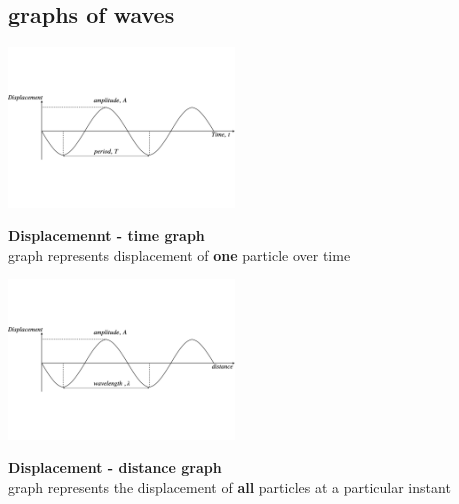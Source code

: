 \documentclass[a4paper, 10pt]{article}
\begin{document}
\subsection{graphs of waves}
\begin{minipage}{0.5\textwidth}
\includegraphics[trim = 50 50 50 50, width=6cm]{figures/1.pdf}
\end{minipage}	
\begin{minipage}{0.5\textwidth}
\textbf{Displacemennt - time graph} \\
graph represents displacement of \textbf{one} particle over time 
\end{minipage}	
\begin{minipage}{0.5\textwidth}
\includegraphics[trim = 50 50 50 50, width=6cm]{figures/2.pdf}
\end{minipage}	
\begin{minipage}{0.5\textwidth}
   \textbf{Displacement - distance graph} \\
graph represents the displacement of \textbf{all} particles at a particular instant
\end{minipage}	
\end{document}
